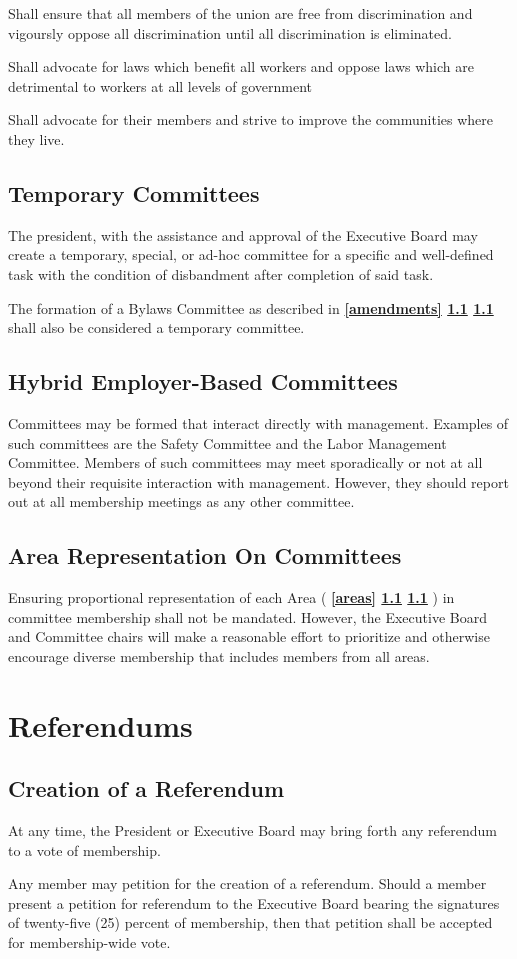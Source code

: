\documentclass[11pt]{article}
\newcommand{\article}[1]{\vspace{.50cm}\section{#1}}
\newcommand{\articlesection}[1]{\vspace{.25cm}\subsection{#1}}
\newcommand{\fullref}[3]{%
  \textbf{%
    \ifthenelse{\isempty{#1}}%
    {}%
    {\ref{#1}}%
    \ifthenelse{\isempty{#2}}%
    {}%
    {%
      \ifthenelse{\isempty{#1}}{}{, }%
      \ref{#2}%
    }%
    \ifthenelse{\isempty{#3}}%
    {}%
    {\ref{#3}}%
  }%
}
\begin{document}
\begin{description}[labelwidth=\linewidth, listparindent=0pt]
\item[Human Rights Committee]
Shall ensure that all members of the union are free from discrimination and vigoursly oppose all discrimination until all discrimination is eliminated.

\item[Legislative/Political Action Committee]
Shall advocate for laws which benefit all workers and oppose laws which are detrimental to workers at all levels of government

\item[Community Action Committee]
Shall advocate for their members and strive to improve the communities where they live.
\end{description}

\articlesection{Temporary Committees}
The president, with the assistance and approval of the Executive Board may create a temporary, special, or ad-hoc committee for a specific and well-defined task with the condition of disbandment after completion of said task.

The formation of a Bylaws Committee as described in \fullref{amendments}{}{} shall also be considered a temporary committee.

\articlesection{Hybrid Employer-Based Committees}
Committees may be formed that interact directly with management. Examples of such committees are the Safety Committee and the Labor Management Committee. Members of such committees may meet sporadically or not at all beyond their requisite interaction with management. However, they should report out at all membership meetings as any other committee.

\articlesection{Area Representation On Committees}
Ensuring proportional representation of each Area (\fullref{areas}{}{}) in committee membership shall not be mandated. However, the Executive Board and Committee chairs will make a reasonable effort to prioritize and otherwise encourage diverse membership that includes members from all areas.


\article{Referendums}\label{referendums}
\articlesection{Creation of a Referendum}
\begin{paralist}
  \item At any time, the President or Executive Board may bring forth any referendum to a vote of membership.

  \item Any member may petition for the creation of a referendum. Should a member present a petition for referendum to the Executive Board bearing the signatures of twenty-five (25) percent of membership, then that petition shall be accepted for membership-wide vote.
\end{paralist}
\end{document}
